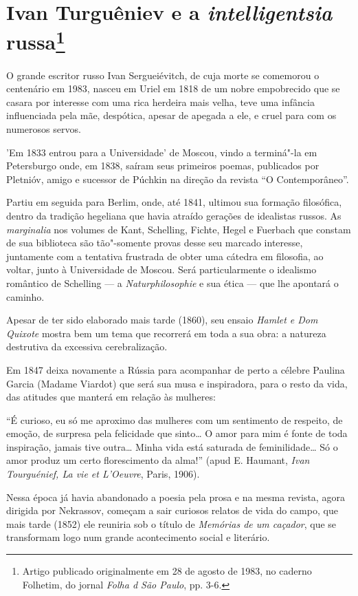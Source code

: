 \chapter{Ivan Turguêniev e a \emph{intelligentsia} russa\footnote{Artigo
  publicado originalmente em 28 de agosto de 1983, no caderno Folhetim,
  do jornal \emph{Folha d São Paulo}, pp. 3-6.}}


O grande escritor russo Ivan Sergueiévitch, de cuja morte se comemorou o
centenário em 1983, nasceu em Uriel em 1818 de um nobre empobrecido que se casara por interesse com uma rica
herdeira mais velha, teve uma infância influenciada pela mãe, despótica,
apesar de apegada a ele, e cruel para com os numerosos servos.

'Em 1833 entrou para a Universidade' de Moscou, vindo a terminá"-la em
Petersburgo onde, em 1838, saíram seus primeiros poemas, publicados por
Pletnióv, amigo e sucessor de Púchkin na direção da revista ``O
Contemporâneo''.

Partiu em seguida para Berlim, onde, até 1841, ultimou sua formação
filosófica, dentro da tradição hegeliana que havia atraído gerações de
idealistas russos. As \emph{marginalia} nos volumes de Kant, Schelling,
Fichte, Hegel e Fuerbach que constam de sua biblioteca são tão"-somente
provas desse seu marcado interesse, juntamente com a tentativa frustrada
de obter uma cátedra em filosofia, ao voltar, junto à Universidade de
Moscou. Será particularmente o idealismo romântico de Schelling --- a
\emph{Naturphilosophie} e sua ética --- que lhe apontará o caminho.

Apesar de ter sido elaborado mais tarde (1860), seu ensaio \emph{Hamlet e Dom
Quixote} mostra bem um tema que recorrerá em toda a sua obra: a natureza
destrutiva da excessiva cerebralização.

Em 1847 deixa novamente a Rússia para acompanhar de perto a célebre
Paulina Garcia (Madame Viardot) que será sua musa e inspiradora, para o
resto da vida, das atitudes que manterá em relação às mulheres:

``É curioso, eu só me aproximo das mulheres com um sentimento de
respeito, de emoção, de surpresa pela felicidade que sinto\ldots{} O amor para
mim é fonte de toda inspiração, jamais tive outra\ldots{} Minha vida está
saturada de feminilidade\ldots{} Só o amor produz um certo florescimento da
alma!'' (apud E. Haumant, \emph{Ivan Tourguénief, La vie et L'Oeuvre},
Paris, 1906).

Nessa época já havia abandonado a poesia pela prosa e na mesma revista,
agora dirigida por Nekrassov, começam a sair curiosos relatos de vida do
campo, que mais tarde (1852) ele reuniria sob o título de \emph{Memórias
de um caçador}, que se transformam logo num grande acontecimento social
e literário.

